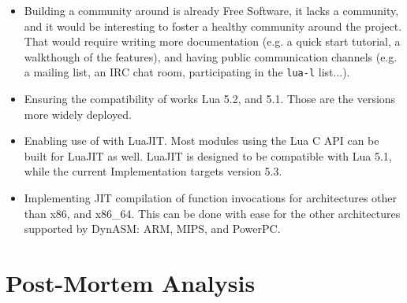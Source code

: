 \begin{itemize}

	\item Building a community around \Eol* is already Free Software, it lacks
	a community, and it would be interesting to foster a healthy community
	around the project. That would require writing more documentation (e.g.
	a quick start tutorial, a walkthough of the features), and having public
	communication channels (e.g. a mailing list, an \gls{IRC} chat room,
	participating in the \verb|lua-l| list...).

	\item Ensuring the compatibility of \Eol* works Lua 5.2, and 5.1. Those
	are the versions more widely deployed.

	\item Enabling use of \Eol* with LuaJIT. Most modules using the Lua C API
	can be built for LuaJIT as well. LuaJIT is designed to be compatible with
	Lua	5.1, while the current Implementation targets version 5.3.

	\item Implementing JIT compilation of function invocations for
	architectures other than x86, and x86\_64. This can be done with ease for
	the other architectures supported by DynASM: ARM, MIPS, and PowerPC.

\end{itemize}


\section{Post-Mortem Analysis}

